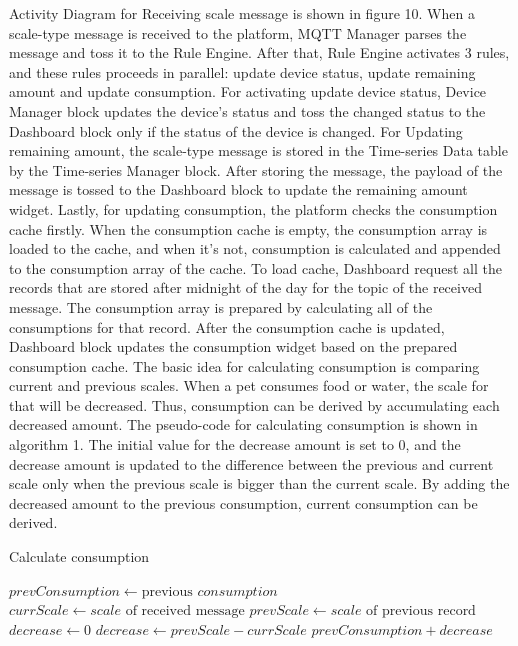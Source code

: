 \documentclass[conference]{IEEEtran}
\begin{document}
Activity Diagram for Receiving scale message is shown in figure 10. When a scale-type message is received to the platform, MQTT Manager parses the message and toss it to the Rule Engine. After that, Rule Engine activates 3 rules, and these rules proceeds in parallel: update device status, update remaining amount and update consumption. For activating update device status, Device Manager block updates the device’s status and toss the changed status to the Dashboard block only if the status of the device is changed. For Updating remaining amount, the scale-type message is stored in the Time-series Data table by the Time-series Manager block. After storing the message, the payload of the message is tossed to the Dashboard block to update the remaining amount widget.
Lastly, for updating consumption, the platform checks the consumption cache firstly. When the consumption cache is empty, the consumption array is loaded to the cache, and when it’s not, consumption is calculated and appended to the consumption array of the cache. To load cache, Dashboard request all the records that are stored after midnight of the day for the topic of the received message. The consumption array is prepared by calculating all of the consumptions for that record. After the consumption cache is updated, Dashboard block updates the consumption widget based on the prepared consumption cache.
The basic idea for calculating consumption is comparing current and previous scales. When a pet consumes food or water, the scale for that will be decreased. Thus, consumption can be derived by accumulating each decreased amount. The pseudo-code for calculating consumption is shown in algorithm 1. The initial value for the decrease amount is set to 0, and the decrease amount is updated to the difference between the previous and current scale only when the previous scale is bigger than the current scale. By adding the decreased amount to the previous consumption, current consumption can be derived.

\begin{algorithm}
\caption{Calculate consumption}\label{algo}
\begin{algorithmic}[1]
        \State $prevConsumption \gets \text{previous } \textit{consumption}$
        \State $currScale \gets \textit{scale} \text{ of received message}$
        \State $prevScale \gets \textit{scale} \text{ of  previous record}$
        \State $decrease \gets 0$
            \State $decrease \gets prevScale - currScale$
        \EndIf
        \Return $prevConsumption + decrease$
    \EndProcedure
\end{algorithmic}
\end{algorithm}
\end{document}
